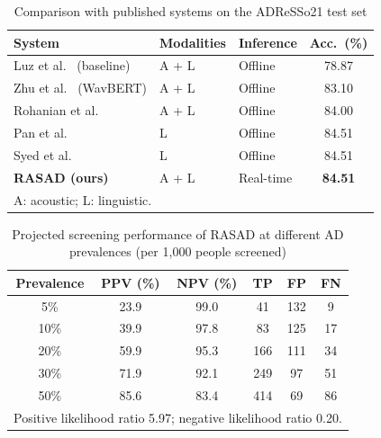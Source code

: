 \begin{table}[!t]
\centering
\caption{Comparison with published systems on the ADReSSo21 test set}
\label{tab:adresso}
\begin{tabular}{lllc}
\toprule
System & Modalities & Inference & Acc.\ (\%) \\
\midrule
Luz et al.~\cite{b35} (baseline) & A + L & Offline & 78.87 \\
Zhu et al.~\cite{b20} (WavBERT)  & A + L & Offline & 83.10 \\
Rohanian et al.~\cite{b15}       & A + L & Offline & 84.00 \\
Pan et al.~\cite{b8}             & L     & Offline & 84.51 \\
Syed et al.~\cite{b18}           & L     & Offline & 84.51 \\
\midrule
\textbf{RASAD (ours)}            & A + L & Real-time & \textbf{84.51} \\
\bottomrule
\multicolumn{4}{l}{\footnotesize A: acoustic; L: linguistic.}
\end{tabular}
\end{table}


\begin{table}[!t]
\centering
\caption{Projected screening performance of RASAD at different AD prevalences (per 1{,}000 people screened)}
\label{tab:screening}
\begin{tabular}{cccccc}
\toprule
Prevalence & PPV (\%) & NPV (\%) & TP & FP & FN \\
\midrule
5\%  & 23.9 & 99.0 & 41  & 132 & 9  \\
10\% & 39.9 & 97.8 & 83  & 125 & 17 \\
20\% & 59.9 & 95.3 & 166 & 111 & 34 \\
30\% & 71.9 & 92.1 & 249 & 97  & 51 \\
50\% & 85.6 & 83.4 & 414 & 69  & 86 \\
\bottomrule
\multicolumn{6}{l}{\footnotesize Positive likelihood ratio 5.97; negative likelihood ratio 0.20.}
\end{tabular}
\end{table}
